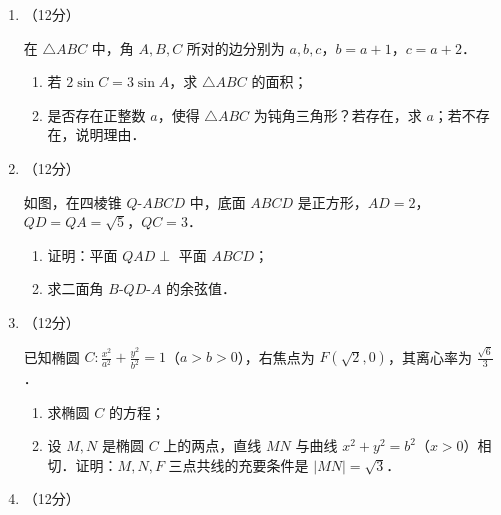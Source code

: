 \begin{description}
\begin{enumerate}[leftmargin=5pt]
        记 $S_{n}$ 是公差不为0的等差数列 $\{a_{n}\}$ 的前 $n$ 项和，若 $a_{3}=S_{5}$，$a_{2}a_{4}=S_{4}$．

        \begin{enumerate}[label=(\arabic*)]
            \item 求数列 $\{a_{n}\}$ 的通项公式；
            \item 求使 $S_{n}>a_{n}$ 成立的 $n$ 的最小值．
        \end{enumerate}

        \item （12分）

        在 $\triangle ABC$ 中，角 $A,B,C$ 所对的边分别为 $a,b,c$，$b=a+1$，$c=a+2$．

        \begin{enumerate}[label=(\arabic*)]
            \item 若 $2\sin C=3\sin A$，求 $\triangle ABC$ 的面积；
            \item 是否存在正整数 $a$，使得 $\triangle ABC$ 为钝角三角形？若存在，求 $a$；若不存在，说明理由．
        \end{enumerate}

        \item （12分）

        如图，在四棱锥 $Q$-$ABCD$ 中，底面 $ABCD$ 是正方形，$AD=2$，$QD=QA=\sqrt{5}$，$QC=3$．

        \begin{enumerate}[label=(\arabic*)]
            \item 证明：平面 $QAD\perp$ 平面 $ABCD$；
            \item 求二面角 $B$-$QD$-$A$ 的余弦值．
        \end{enumerate}

        \item （12分）

        已知椭圆 $C:\frac{x^{2}}{a^{2}}+\frac{y^{2}}{b^{2}}=1$（$a>b>0$），右焦点为 $F(\sqrt{2},0)$，其离心率为 $\frac{\sqrt{6}}{3}$．

        \begin{enumerate}[label=(\arabic*)]
            \item 求椭圆 $C$ 的方程；
            \item 设 $M,N$ 是椭圆 $C$ 上的两点，直线 $MN$ 与曲线 $x^{2}+y^{2}=b^{2}$（$x>0$）相切．证明：$M,N,F$ 三点共线的充要条件是 $|MN|=\sqrt{3}$．
        \end{enumerate}

        \item （12分）


\end{enumerate}
\end{description}
